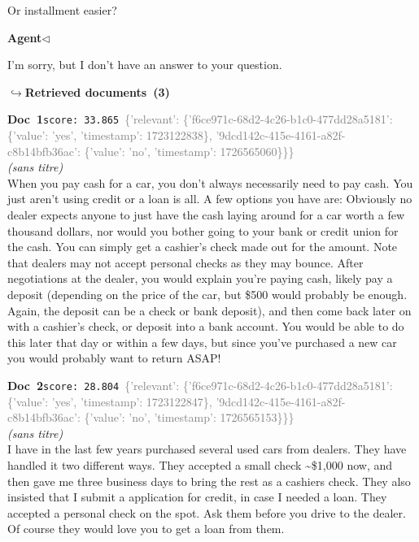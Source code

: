 \documentclass[a4paper,11pt]{article}
\begin{document}
\begin{userbubble}
Or installment easier?
\end{userbubble}
\noindent\hfill{\small\textcolor{agentcolor}{\textbf{Agent\enspace$\triangleleft$}}}
\begin{agentbubble}
I'm sorry, but I don't have an answer to your question.
\end{agentbubble}
\noindent\hfill{\footnotesize\textcolor{doccolor}{\textbf{$\hookrightarrow$\enspace Retrieved documents~(3)}}}
\begin{docenv}
{\footnotesize\textcolor{doccolor}{\textbf{Doc~1}}}\hfill{\tiny\texttt{score:~33.865}}\ {\tiny\textcolor{gray}{\{'relevant': \{'f6ce971c-68d2-4c26-b1c0-477dd28a5181': \{'value': 'yes', 'timestamp': 1723122838\}, '9dcd142c-415e-4161-a82f-c8b14bfb36ac': \{'value': 'no', 'timestamp': 1726565060\}\}\}}}\\[3pt]
{\small\textit{(sans titre)}}\\[2pt]
\vspace{2pt}
{\footnotesize 
When you pay cash for a car, you don't always necessarily need to pay cash. You just aren't using credit or a loan is all. A few options you have are: Obviously no dealer expects anyone to just have the cash laying around for a car worth a few thousand dollars, nor would you bother going to your bank or credit union for the cash. You can simply get a cashier's check made out for the amount. Note that dealers may not accept personal checks as they may bounce.  After negotiations at the dealer, you would explain you're paying cash, likely pay a deposit (depending on the price of the car, but \$500 would probably be enough. Again, the deposit can be a check or bank deposit), and then come back later on with a cashier's check, or deposit into a bank account. You would be able to do this later that day or within a few days, but since you've purchased a new car you would probably want to return ASAP!}
\end{docenv}
\begin{docenv}
{\footnotesize\textcolor{doccolor}{\textbf{Doc~2}}}\hfill{\tiny\texttt{score:~28.804}}\ {\tiny\textcolor{gray}{\{'relevant': \{'f6ce971c-68d2-4c26-b1c0-477dd28a5181': \{'value': 'yes', 'timestamp': 1723122847\}, '9dcd142c-415e-4161-a82f-c8b14bfb36ac': \{'value': 'no', 'timestamp': 1726565153\}\}\}}}\\[3pt]
{\small\textit{(sans titre)}}\\[2pt]
\vspace{2pt}
{\footnotesize 
I have in the last few years purchased several used cars from dealers. They have handled it two different ways. They accepted a small check \textasciitilde{}\$1,000 now, and then gave me three business days to bring the rest as a cashiers check. They also insisted that I submit a application for credit, in case I needed a loan.  They accepted a personal check on the spot. Ask them before you drive to the dealer. Of course they would love you to get a loan from them.}
\end{docenv}
\end{document}
